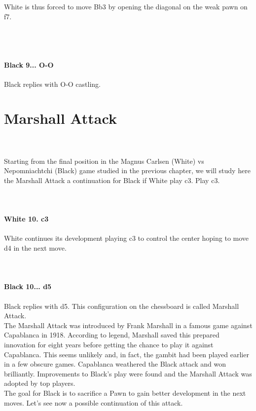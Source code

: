 \documentclass{article}
\begin{document}
White is thus forced to move Bb3 by opening the diagonal on the weak pawn on f7.\\\\
\\

\\
\\
\textbf{Black 9... O-O}\\
\\
Black replies with O-O castling.\section{ Marshall Attack}

\\
\\
Starting from the final position in the Magnus Carlsen (White) vs Nepomniachtchi (Black) game studied in the previous chapter, we will study here the Marshall Attack a continuation for Black if White play c3. Play c3.\\
\\

\\
\\
\textbf{White 10. c3}\\
\\
White continues its development playing c3 to control the center hoping to move d4 in the next move.\\
\\

\\
\\
\textbf{Black 10... d5}\\
\\
Black replies with d5. This configuration on the chessboard is called Marshall Attack.\\The Marshall Attack was introduced by Frank Marshall in a famous game against Capablanca in 1918. According to legend, Marshall saved this prepared innovation for eight years before getting the chance to play it against Capablanca. This seems unlikely and, in fact, the gambit had been played earlier in a few obscure games. Capablanca weathered the Black attack and won brilliantly. Improvements to Black's play were found and the Marshall Attack was adopted by top players.\\The goal for Black is to sacrifice a Pawn to gain better development in the next moves. Let's see now a possible continuation of this attack.\\
\end{document}
